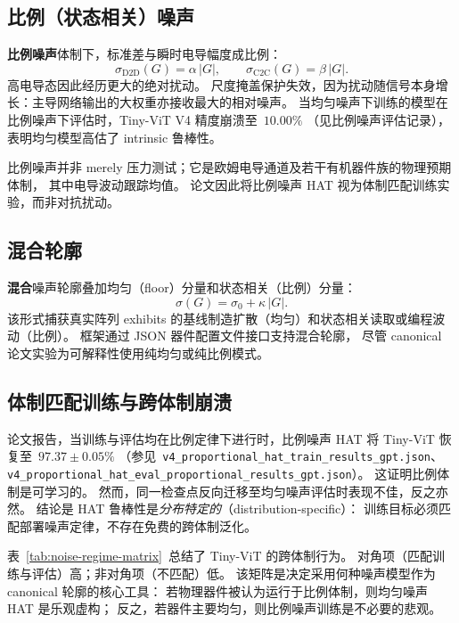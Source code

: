 \subsection{比例（状态相关）噪声}

\textbf{比例噪声}体制下，标准差与瞬时电导幅度成比例：
\begin{equation}
    \sigma_{\mathrm{D2D}}(G) = \alpha\,|G|, \qquad \sigma_{\mathrm{C2C}}(G) = \beta\,|G|.
\end{equation}
高电导态因此经历更大的绝对扰动。
尺度掩盖保护失效，因为扰动随信号本身增长：主导网络输出的大权重亦接收最大的相对噪声。
当均匀噪声下训练的模型在比例噪声下评估时，Tiny-ViT V4 精度崩溃至~$10.00\%$
（见比例噪声评估记录），
表明均匀模型高估了 intrinsic 鲁棒性。

比例噪声并非 merely 压力测试；它是欧姆电导通道及若干有机器件族的物理预期体制，
其中电导波动跟踪均值。
论文因此将比例噪声 HAT 视为体制匹配训练实验，而非对抗扰动。

\subsection{混合轮廓}

\textbf{混合}噪声轮廓叠加均匀（floor）分量和状态相关（比例）分量：
\begin{equation}
    \sigma(G) = \sigma_{0} + \kappa\,|G|.
\end{equation}
该形式捕获真实阵列 exhibits 的基线制造扩散（均匀）和状态相关读取或编程波动（比例）。
框架通过 JSON 器件配置文件接口支持混合轮廓，
尽管 canonical 论文实验为可解释性使用纯均匀或纯比例模式。

\subsection{体制匹配训练与跨体制崩溃}

论文报告，当训练与评估均在比例定律下进行时，比例噪声 HAT 将 Tiny-ViT 恢复至~$97.37\pm0.05\%$
（参见~\texttt{v4\_proportional\_hat\_train\_results\_gpt.json}、\texttt{v4\_proportional\_hat\_eval\_proportional\_results\_gpt.json}）。
这证明比例体制是可学习的。
然而，同一检查点反向迁移至均匀噪声评估时表现不佳，反之亦然。
结论是 HAT 鲁棒性是\emph{分布特定的}（distribution-specific）：
训练目标必须匹配部署噪声定律，不存在免费的跨体制泛化。

表~\ref{tab:noise-regime-matrix}~总结了 Tiny-ViT 的跨体制行为。
对角项（匹配训练与评估）高；非对角项（不匹配）低。
该矩阵是决定采用何种噪声模型作为 canonical 轮廓的核心工具：
若物理器件被认为运行于比例体制，则均匀噪声 HAT 是乐观虚构；
反之，若器件主要均匀，则比例噪声训练是不必要的悲观。

